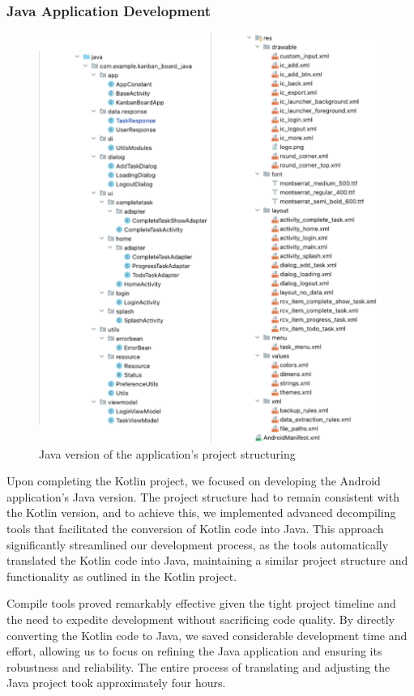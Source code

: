 \subsubsection{Java Application Development}
\begin{figure}[htbp]
    \centering
    \includegraphics[scale = 0.8]{img/java_project_struct.png}
    \caption{Java version of the application’s project structuring}
    \label{fig:java_project_struct}
\end{figure}
\par
Upon completing the Kotlin project, we focused on developing the Android application's Java version. The project structure had to remain consistent with the Kotlin version, and to achieve this, we implemented advanced decompiling tools that facilitated the conversion of Kotlin code into Java. This approach significantly streamlined our development process, as the tools automatically translated the Kotlin code into Java, maintaining a similar project structure and functionality as outlined in the Kotlin project.
\par
Compile tools proved remarkably effective given the tight project timeline and the need to expedite development without sacrificing code quality. By directly converting the Kotlin code to Java, we saved considerable development time and effort, allowing us to focus on refining the Java application and ensuring its robustness and reliability. The entire process of translating and adjusting the Java project took approximately four hours.
